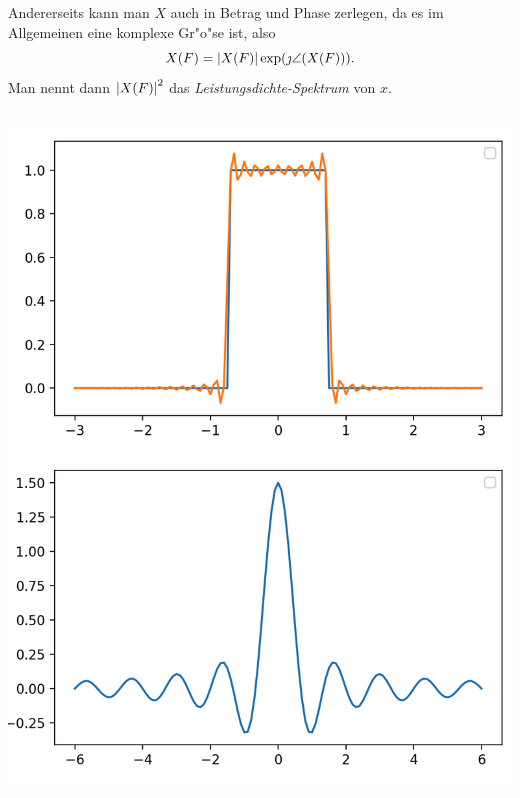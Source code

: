 Andererseits kann man $X$ auch in Betrag und Phase zerlegen, da es im Allgemeinen eine komplexe Gr"o"se ist, also
\[
X(F) = {\left| X(F) \right|} \exp(\jmath \angle(X(F))).
\]
Man nennt dann ${\left| X(F) \right|}^2$ das \emph{Leistungsdichte-Spektrum} von $x$.

\begin{listing}[ht]
    \noindent
    \begin{minipage}{0.51\textwidth}
        \strut\vspace*{-\baselineskip}\newline
        \inputminted[firstline=6, lastline=45]{python3}{code/fourier_trafo.py}
    \end{minipage}%
    \begin{minipage}{0.48\textwidth}
        \strut\vspace*{-\baselineskip}\newline
        \includegraphics[width=\textwidth]{code/fourier_trafo.png}
    \end{minipage}
    \label{py:fourier_trafo}
\end{listing}

